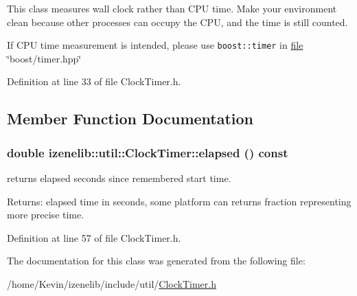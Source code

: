 This class measures wall clock rather than CPU time. Make your environment clean because other processes can occupy the CPU, and the time is still counted.

If CPU time measurement is intended, please use {\tt boost::timer} in \hyperlink{classfile}{file} \char`\"{}boost/timer.hpp\char`\"{} 

Definition at line 33 of file ClockTimer.h.

\subsection{Member Function Documentation}
\hypertarget{classizenelib_1_1util_1_1ClockTimer_bdbd2f2fa3057fdec1144b9660043478}{
\subsubsection[{elapsed}]{\setlength{\rightskip}{0pt plus 5cm}double izenelib::util::ClockTimer::elapsed () const}}
\label{classizenelib_1_1util_1_1ClockTimer_bdbd2f2fa3057fdec1144b9660043478}


returns elapsed seconds since remembered start time. 

\begin{Desc}
\item[Returns:]elapsed time in seconds, some platform can returns fraction representing more precise time. \end{Desc}


Definition at line 57 of file ClockTimer.h.

The documentation for this class was generated from the following file:\begin{CompactItemize}
\item 
/home/Kevin/izenelib/include/util/\hyperlink{ClockTimer_8h}{ClockTimer.h}\end{CompactItemize}
